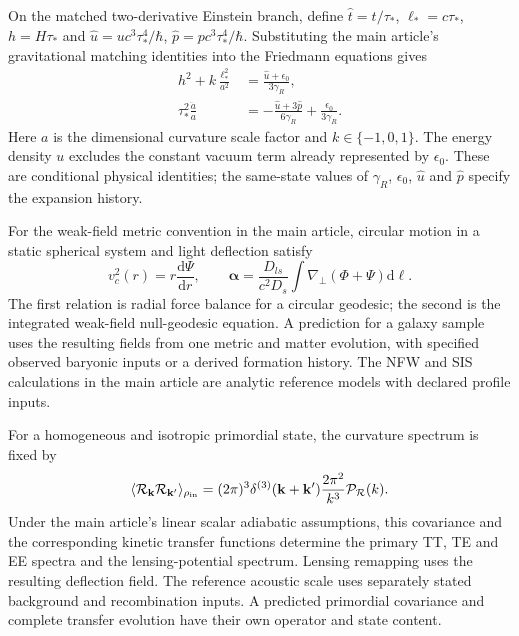 \documentclass[11pt,a4paper]{article}
\newcommand{\dd}{\mathrm{d}}\DeclareMathOperator{\Tr}{Tr}
\begin{document}
On the matched two-derivative Einstein branch, define $\widehat t=t/\tau_*$, $\ell_*=c\tau_*$, $h=H\tau_*$ and
$\widehat u=uc^3\tau_*^4/\hbar$, $\widehat p=pc^3\tau_*^4/\hbar$.
Substituting the main article's gravitational matching identities into the Friedmann equations gives
\begin{align}
h^2+k\frac{\ell_*^2}{a^2}&=\frac{\widehat u+\epsilon_0}{3\gamma_R},\label{si:eq:copy-friedmann}\\
\tau_*^2\frac{\ddot a}{a}&=-\frac{\widehat u+3\widehat p}{6\gamma_R}+\frac{\epsilon_0}{3\gamma_R}.
\end{align}
Here $a$ is the dimensional curvature scale factor and $k\in\{-1,0,1\}$. The energy density $u$ excludes the constant vacuum term already represented by $\epsilon_0$. These are conditional physical identities; the same-state values of $\gamma_R$, $\epsilon_0$, $\widehat u$ and $\widehat p$ specify the expansion history.

For the weak-field metric convention in the main article, circular motion in a static spherical system and light deflection satisfy
\begin{equation}\label{si:eq:common-galaxy-metric}
v_c^2(r)=r\frac{\dd\Psi}{\dd r},\qquad
\bm\alpha=\frac{D_{ls}}{c^2D_s}\int\nabla_\perp(\Phi+\Psi)\dd\ell.
\end{equation}
The first relation is radial force balance for a circular geodesic; the second is the integrated weak-field null-geodesic equation. A prediction for a galaxy sample uses the resulting fields from one metric and matter evolution, with specified observed baryonic inputs or a derived formation history. The NFW and SIS calculations in the main article are analytic reference models with declared profile inputs.

For a homogeneous and isotropic primordial state, the curvature spectrum is fixed by
\begin{equation}\label{si:eq:primordial-state}
\langle\mathcal R_{\mathbf k}\mathcal R_{\mathbf k'}\rangle_{\rho_{\rm in}}
=(2\pi)^3\delta^{(3)}(\mathbf k+\mathbf k')\frac{2\pi^2}{k^3}\mathcal P_{\mathcal R}(k).
\end{equation}
Under the main article's linear scalar adiabatic assumptions, this covariance and the corresponding kinetic transfer functions determine the primary TT, TE and EE spectra and the lensing-potential spectrum. Lensing remapping uses the resulting deflection field. The reference acoustic scale uses separately stated background and recombination inputs. A predicted primordial covariance and complete transfer evolution have their own operator and state content.
\end{document}
